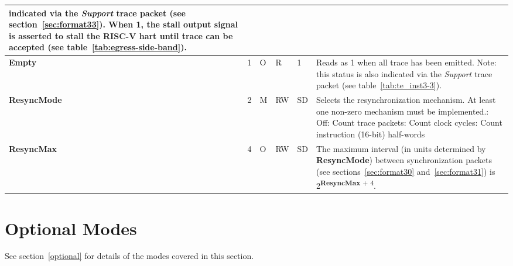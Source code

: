 \begin{table}[htp]
\begin{tabulary}{\textwidth}{|l|l|l|l|l|p{90mm}|}
      indicated via the \textit{Support} trace packet (see section~\ref{sec:format33}).\newline
      When 1, the \textbf{stall} output signal is asserted to stall the RISC-V hart until trace can be accepted (see table~\ref{tab:egress-side-band}).\\
    \hline
    \textbf{Empty} & 1 & O & R & 1 & Reads as 1 when all trace has been emitted.  Note: this status is also indicated via the 
      \textit{Support} trace packet (see table~\ref{tab:te_inst3-3}).\\
    \hline
    \textbf{ResyncMode} & 2 & M & RW & SD & Selects the resynchronization mechanism.  At least one non-zero mechanism must be implemented.: Off: Count trace packets: Count clock cycles: Count instruction (16-bit) half-words\\
    \hline
    \textbf{ResyncMax} & 4 & O & RW & SD & The maximum interval (in units determined by \textbf{ResyncMode}) between synchronization packets
    (see sections~\ref{sec:format30} and~\ref{sec:format31}) is 2\textsuperscript{\textbf{ResyncMax} + 4}.\\
    \hline
  \end{tabulary}
\end{table}

\FloatBarrier
\section{Optional Modes} \label{sec:ctl-modes}

See section~\ref{optional} for details of the modes covered in this section.

